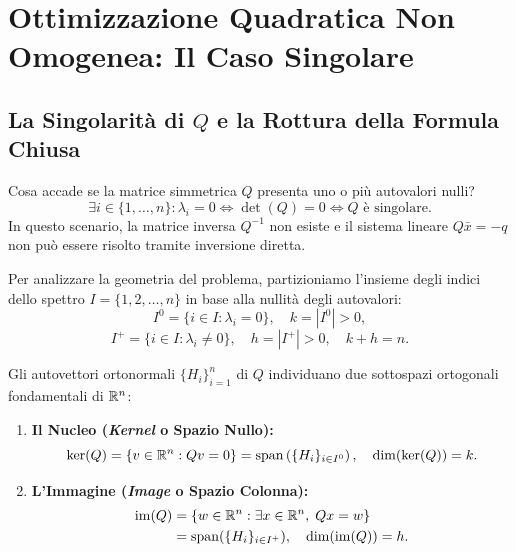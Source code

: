 \section{Ottimizzazione Quadratica Non Omogenea: Il Caso Singolare}
\label{sec:quadratica-non-omogenea-singolare}

\subsection{La Singolarit\`a di \texorpdfstring{$Q$}{Q} e la Rottura della Formula Chiusa}
Cosa accade se la matrice simmetrica $Q$ presenta uno o pi\`u autovalori nulli?
\begin{equation}
    \exists i \in \{1, \dots, n\} : \lambda_i = 0 \iff \det(Q) = 0 \iff Q \text{ \`e singolare}.
\end{equation}
In questo scenario, la matrice inversa $Q^{-1}$ non esiste e il sistema lineare $Q \bar{x} = -q$ non pu\`o essere risolto tramite inversione diretta.

Per analizzare la geometria del problema, partizioniamo l'insieme degli indici dello spettro $I = \{1, 2, \dots, n\}$ in base alla nullit\`a degli autovalori:
\begin{equation}
    I^0 = \{i \in I : \lambda_i = 0\}, \quad k = |I^0| > 0,
\end{equation}
\begin{equation}
    I^+ = \{i \in I : \lambda_i \neq 0\}, \quad h = |I^+| > 0, \quad k + h = n.
\end{equation}

Gli autovettori ortonormali $\{H_i\}_{i=1}^n$ di $Q$ individuano due sottospazi ortogonali fondamentali di $\mathbb{R}^n$:
\begin{enumerate}
    \item \textbf{Il Nucleo (\textit{Kernel} o Spazio Nullo):}
    \begin{equation}
        \ker(Q) = \{v \in \mathbb{R}^n : Qv = 0\} = \operatorname{span}\left(\{H_i\}_{i \in I^0}\right), \quad \dim(\ker(Q)) = k.
    \end{equation}
    \item \textbf{L'Immagine (\textit{Image} o Spazio Colonna):}
    \begin{align}
        \operatorname{im}(Q) &= \{w \in \mathbb{R}^n : \exists x \in \mathbb{R}^n, \; Qx = w\} \nonumber \\
        &= \operatorname{span}(\{H_i\}_{i \in I^+}), \quad \dim(\operatorname{im}(Q)) = h.
    \end{align}
\end{enumerate}


